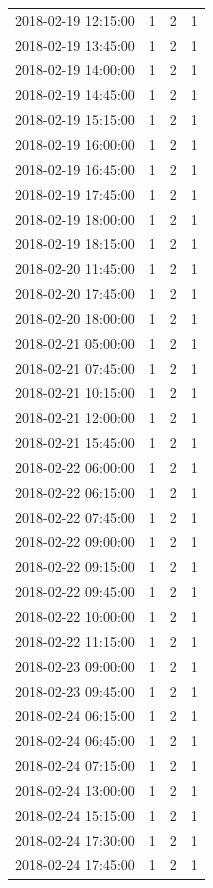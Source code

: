 \begin{tabular}{lrrr}
2018-02-19 12:15:00 & 1 & 2 & 1 \\
2018-02-19 13:45:00 & 1 & 2 & 1 \\
2018-02-19 14:00:00 & 1 & 2 & 1 \\
2018-02-19 14:45:00 & 1 & 2 & 1 \\
2018-02-19 15:15:00 & 1 & 2 & 1 \\
2018-02-19 16:00:00 & 1 & 2 & 1 \\
2018-02-19 16:45:00 & 1 & 2 & 1 \\
2018-02-19 17:45:00 & 1 & 2 & 1 \\
2018-02-19 18:00:00 & 1 & 2 & 1 \\
2018-02-19 18:15:00 & 1 & 2 & 1 \\
2018-02-20 11:45:00 & 1 & 2 & 1 \\
2018-02-20 17:45:00 & 1 & 2 & 1 \\
2018-02-20 18:00:00 & 1 & 2 & 1 \\
2018-02-21 05:00:00 & 1 & 2 & 1 \\
2018-02-21 07:45:00 & 1 & 2 & 1 \\
2018-02-21 10:15:00 & 1 & 2 & 1 \\
2018-02-21 12:00:00 & 1 & 2 & 1 \\
2018-02-21 15:45:00 & 1 & 2 & 1 \\
2018-02-22 06:00:00 & 1 & 2 & 1 \\
2018-02-22 06:15:00 & 1 & 2 & 1 \\
2018-02-22 07:45:00 & 1 & 2 & 1 \\
2018-02-22 09:00:00 & 1 & 2 & 1 \\
2018-02-22 09:15:00 & 1 & 2 & 1 \\
2018-02-22 09:45:00 & 1 & 2 & 1 \\
2018-02-22 10:00:00 & 1 & 2 & 1 \\
2018-02-22 11:15:00 & 1 & 2 & 1 \\
2018-02-23 09:00:00 & 1 & 2 & 1 \\
2018-02-23 09:45:00 & 1 & 2 & 1 \\
2018-02-24 06:15:00 & 1 & 2 & 1 \\
2018-02-24 06:45:00 & 1 & 2 & 1 \\
2018-02-24 07:15:00 & 1 & 2 & 1 \\
2018-02-24 13:00:00 & 1 & 2 & 1 \\
2018-02-24 15:15:00 & 1 & 2 & 1 \\
2018-02-24 17:30:00 & 1 & 2 & 1 \\
2018-02-24 17:45:00 & 1 & 2 & 1 \\

\end{tabular}
